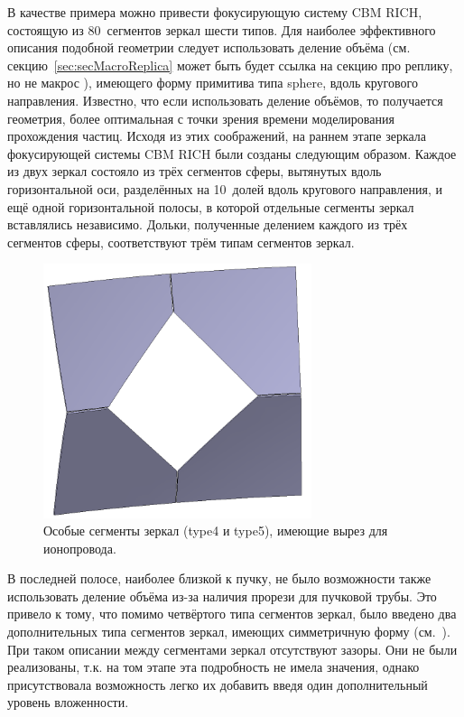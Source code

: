 В качестве примера можно привести фокусирующую систему CBM RICH, состоящую из 80~сегментов зеркал шести типов. Для наиболее эффективного описания подобной геометрии следует использовать деление объёма (см. секцию~\ref{sec:secMacroReplica} \todo может быть будет ссылка на секцию про реплику, но не макрос \todo), имеющего форму примитива типа sphere, вдоль кругового направления. Известно, что если использовать деление объёмов, то получается геометрия, более оптимальная с точки зрения времени моделирования прохождения частиц. Исходя из этих соображений, на раннем этапе зеркала фокусирующей системы CBM RICH были созданы следующим образом. Каждое из двух зеркал состояло из трёх сегментов сферы, вытянутых вдоль горизонтальной оси, разделённых на 10~долей вдоль кругового направления, и ещё одной горизонтальной полосы, в которой отдельные сегменты зеркал вставлялись независимо. Дольки, полученные делением каждого из трёх сегментов сферы, соответствуют трём типам сегментов зеркал. 


\begin{minipage}[t]{0.395\textwidth}
\begin{figure}[H]
\centering
\includegraphics[width=0.7\textwidth]{pictures/Mirror_tiles_special.png}
\caption{Особые сегменты зеркал (type4 и type5), имеющие вырез для ионопровода.}
\label{fig:SpecialMirrorTiles}
\end{figure}
\end{minipage}
\hspace{0.01\textwidth}
\begin{minipage}[t]{0.495\textwidth}
В последней полосе, наиболее близкой к пучку, не было возможности также использовать деление объёма из-за наличия прорези для пучковой трубы. Это привело к тому, что помимо четвёртого типа сегментов зеркал, было введено два дополнительных типа сегментов зеркал, имеющих симметричную форму (см.~). При таком описании между сегментами зеркал отсутствуют зазоры. Они не были реализованы, т.к. на том этапе эта подробность не имела значения, однако присутствовала возможность легко их добавить введя один дополнительный уровень вложенности.
\end{minipage}


